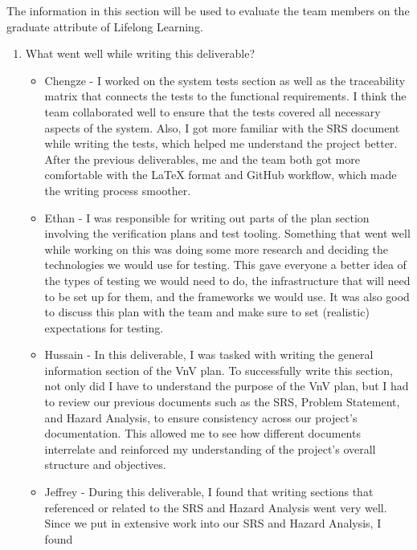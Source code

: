 \documentclass[12pt, titlepage]{article}
\begin{document}

The information in this section will be used to evaluate the team members on the
graduate attribute of Lifelong Learning.



\begin{enumerate}
  \item What went well while writing this deliverable?
  \begin{itemize}
    \item Chengze - I worked on the system tests section as well as the traceability matrix
    that connects the tests to the functional requirements. I think the team collaborated well
    to ensure that the tests covered all necessary aspects of the system. Also, I got more familiar
    with the SRS document while writing the tests, which helped me understand the project better. After
    the previous deliverables, me and the team both got more comfortable with the LaTeX format and GitHub workflow,
    which made the writing process smoother.
    \item Ethan - I was responsible for writing out parts of the plan section
      involving the verification plans and test tooling. Something that went
      well while working on this was doing some more research and deciding the
      technologies we would use for testing. This gave everyone a better idea
      of the types of testing we would need to do, the infrastructure that will
      need to be set up for them, and the frameworks we would use. It was also
      good to discuss this plan with the team and make sure to set (realistic)
      expectations for testing.
    \item Hussain - In this deliverable, I was tasked with writing the
        general information section of the VnV plan. To successfully write
        this section, not only did I have to understand the purpose of the
        VnV plan, but I had to review our previous documents such as the SRS,
        Problem Statement, and Hazard Analysis, to ensure consistency across
        our project's documentation. This allowed me to see how different
        documents interrelate and reinforced my understanding of the
        project's overall structure and objectives.
    \item Jeffrey - During this deliverable, I found that writing sections
      that referenced or related to the SRS and Hazard Analysis went very well.
      Since we put in extensive work into our SRS and Hazard Analysis, I found

\end{itemize}
\end{enumerate}
\end{document}
